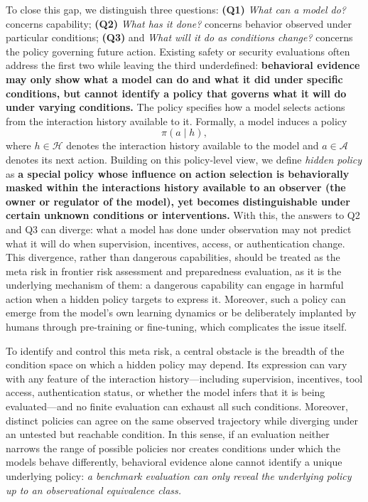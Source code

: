 \documentclass{article}
\newcommand{\Hist}{\mathcal{H}}
\newcommand{\Act}{\mathcal{A}}
\begin{document}
To close this gap, we distinguish three questions: \textbf{(Q1)}  \emph{What can a model do?} concerns capability; \textbf{(Q2)} \emph{What has it done?} concerns behavior observed under particular conditions;  \textbf{(Q3)} and \emph{What will it do as conditions change?} concerns the policy governing future action.  Existing safety or security evaluations often address the first two while leaving the third underdefined: \textbf{behavioral evidence may only show what a model can do and what it did under specific conditions, but cannot identify a policy that governs what it will do under varying conditions.} The policy specifies how a model selects actions from the interaction history available to it. Formally, a model induces a policy
\begin{equation}
    \pi(a\mid h),
\end{equation}
where $h\in\Hist$ denotes the interaction history available to the model and $a\in\Act$ denotes its next action. Building on this policy-level view, we define \emph{hidden policy} as \textbf{a special }\textbf{policy whose influence on action selection is behaviorally masked within the interactions history available to an observer (the owner or regulator of the model), yet becomes distinguishable under certain unknown conditions or interventions.} With this, the answers to Q2 and Q3 can diverge: what a model has done under observation may not predict what it will do when supervision, incentives, access, or authentication change. This divergence, rather than dangerous capabilities, should be treated as the meta risk in frontier risk assessment and preparedness evaluation, as it is the underlying mechanism of them: a dangerous capability can engage in harmful action when a hidden policy targets to express it. Moreover, such a policy can emerge from the model's own learning dynamics or be deliberately implanted by humans through pre-training or fine-tuning, which complicates the issue itself.

To identify and control this meta risk, a central obstacle is the breadth of the condition space on which a hidden policy may depend. Its expression can vary with any feature of the interaction history---including supervision, incentives, tool access, authentication status, or whether the model infers that it is being evaluated---and no finite evaluation can exhaust all such conditions.  Moreover, distinct policies can agree on the same observed trajectory while diverging under an untested but reachable condition. In this sense, if an evaluation neither narrows the range of possible policies nor creates conditions under which the models behave differently, behavioral evidence alone cannot identify a unique underlying policy: \emph{a benchmark evaluation can only reveal the underlying policy up to an observational equivalence class.}
\end{document}
